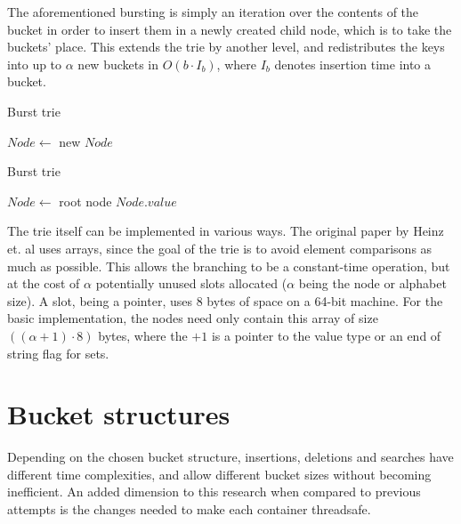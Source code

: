The aforementioned bursting is simply an iteration over the contents of the
bucket in order to insert them in a newly created child node, which is to
take the buckets' place. This extends the trie by another level, and redistributes
the keys into up to $\alpha$ new buckets in $O(b \cdot I_b)$, where $I_b$ denotes
insertion time into a bucket.

\begin{algorithm}[H]
    \caption{Burst trie }
    \label{alg:bt_burst}
    $Node \leftarrow$ new $Node$\;
\end{algorithm}

\begin{algorithm}[H]
    \caption{Burst trie }
    \label{alg:bt_search}

    $Node \leftarrow$  root node\;
    \Return $Node.value$\;
\end{algorithm}

The trie itself can be implemented in various ways. The original paper by Heinz
et. al \cite{Heinz:2002} uses arrays, since the goal of the trie is to avoid
element comparisons as much as possible. This allows the branching to be a
constant-time operation, but at the cost of $\alpha$ potentially unused slots
allocated ($\alpha$ being the node or alphabet size). A slot, being a pointer,
uses 8 bytes of space on a 64-bit machine.
For the basic implementation, the nodes need only contain this array of size
$((\alpha+1) \cdot 8)$ bytes, where the $+1$ is a pointer to the value type or
an end of string flag for sets.


\section{Bucket structures}
Depending on the chosen bucket structure, insertions, deletions and searches
have different time complexities, and allow different bucket sizes without
becoming inefficient. An added dimension to this research when compared to
previous attempts is the changes needed to make each container threadsafe.

